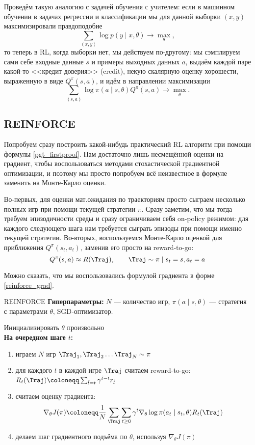 Проведём такую аналогию с задачей обучения с учителем: если в машинном обучении в задачах регрессии и классификации мы для данной выборки $(x, y)$ максимизировали правдоподобие
$$\sum_{(x, y)} \log p(y \mid x, \theta) \to \max_{\theta},$$
то теперь в RL, когда выборки нет, мы действуем по-другому: мы сэмплируем сами себе входные данные $s$ и примеры выходных данных $a$, выдаём каждой паре какой-то <<кредит доверия>> (credit), некую скалярную оценку хорошести, выраженную в виде $Q^{\pi}(s, a)$, и идём в направлении максимизации
$$\sum_{(s, a)} \log \pi(a \mid s, \theta)Q^{\pi}(s, a) \to \max_{\theta}.$$

\subsection{REINFORCE}

Попробуем сразу построить какой-нибудь практический RL алгоритм при помощи формулы \eqref{pgt_firstproof}. Нам достаточно лишь несмещённой оценки на градиент, чтобы воспользоваться методами стохастической градиентной оптимизации, и поэтому мы просто попробуем всё неизвестное в формуле заменить на Монте-Карло оценки. 

Во-первых, для оценки мат.ожидания по траекториям просто сыграем несколько полных игр при помощи текущей стратегии $\pi$. Сразу заметим, что мы тогда требуем эпизодичности среды и сразу ограничиваем себя on-policy режимом: для каждого следующего шага нам требуется сыграть эпизоды при помощи именно текущей стратегии. Во-вторых, воспользуемся Монте-Карло оценкой для приближения $Q^\pi(s_t, a_t)$, заменив его просто на reward-to-go:
$$Q^\pi(s, a) \approx R(\Traj), \qquad \Traj \sim \pi \mid s_t = s, a_t = a$$

Можно сказать, что мы воспользовались формулой градиента в форме \eqref{reinforce_grad}.

\begin{algorithm}[label = REINFORCE]{REINFORCE}
\textbf{Гиперпараметры:} $N$ --- количество игр, $\pi(a \mid s, \theta)$ --- стратегия с параметрами $\theta$, SGD-оптимизатор.

\vspace{0.3cm}
Инициализировать $\theta$ произвольно \\
\textbf{На очередном шаге $t$:}
\begin{enumerate}
    \item играем $N$ игр $\Traj_1, \Traj_2 \dots \Traj_N \sim \pi$
    \item для каждого $t$ в каждой игре $\Traj$ считаем reward-to-go: $R_t(\Traj ) \coloneqq \sum_{\hat{t} = t} \gamma^{\hat{t} - t} r_{\hat{t}}$
    \item считаем оценку градиента:
    $$\nabla_\theta J(\pi) \coloneqq \frac{1}{N}\sum_{\Traj} \sum_{t \ge 0} \gamma^t \nabla_\theta \log \pi(a_t \mid s_t, \theta) R_t(\Traj ) $$
    \item делаем шаг градиентного подъёма по $\theta$, используя $\nabla_\theta J(\pi)$
\end{enumerate}
\end{algorithm}

